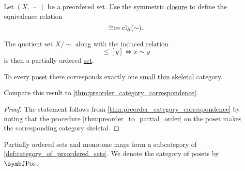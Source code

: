 \begin{proposition}\label{thm:preorder_to_partial_order}
  Let \( (X, \sim) \) be a preordered set. Use the symmetric \hyperref[def:derived_relations/symmetric]{closure} to define the equivalence relation
  \begin{equation*}
    \cong \coloneqq \operatorname{cl}_S(\sim).
  \end{equation*}

  The quotient set \( X / \sim \) along with the induced relation
  \begin{equation*}
    [x] \leq [y] \iff x \sim y
  \end{equation*}
  is then a partially ordered \hyperref[def:poset]{set}.
\end{proposition}

\begin{proposition}\label{thm:partial_order_category_correspondence}
  To every \hyperref[def:poset]{poset} there corresponds exactly one \hyperref[def:category_cardinality]{small} \hyperref[def:thin_category]{thin} \hyperref[def:skeletal_category]{skeletal} category.

  Compare this result to \cref{thm:preorder_category_correspondence}.
\end{proposition}
\begin{proof}
  The statement follows from \cref{thm:preorder_category_correspondence} by noting that the procedure \cref{thm:preorder_to_partial_order} on the poset makes the corresponding category skeletal.
\end{proof}

\begin{definition}\label{def:category_of_posets}
  Partially ordered sets and monotone maps form a subcategory of \cref{def:category_of_preordered_sets}. We denote the category of posets by \( \Cat{Pos} \).
\end{definition}
